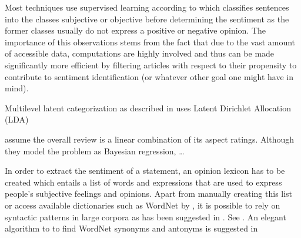 
Most techniques use supervised learning according to \textcite{Wiebe.1999} which classifies sentences into the classes subjective or objective before determining the sentiment as the former classes usually do not express a positive or negative opinion. The importance of this observations stems from the fact that due to the vast amount of accessible data, computations are highly involved and thus can be made significantly more efficient by filtering articles with respect to their propensity to contribute to sentiment identification (or whatever other goal one might have in mind). 


Multilevel latent categorization as described in \textcite{Guo.2009} uses Latent Dirichlet Allocation (LDA) 


\textcite{Wang.2010} assume the overall review is a linear combination of its aspect ratings. Although they model the problem as Bayesian regression, \dots %

In order to extract the sentiment of a statement, an opinion lexicon has to be created which entails a list of words and expressions that are used to express people's subjective feelings and opinions. Apart from manually creating this list or access available dictionaries such as WordNet\textsuperscript{\textregistered} by \textcite{Fellbaum.1998,Esuli.2006}, it is possible to rely on syntactic patterns in large corpora as has been suggested in \textcite{Ding.2008,Hatzivassiloglou.1997,Kanayama.2006,Turney.2002,Yu.2003}. See \textcite{Feldman.2013}. An elegant algorithm to to find WordNet\textsuperscript{\textregistered} synonyms and antonyms is suggested in \textcite{Kamps.2004} %

